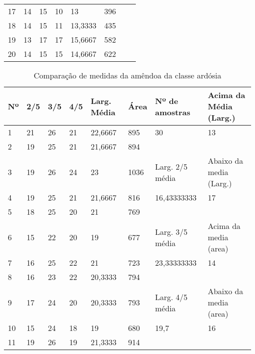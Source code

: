 \begin{anexosenv}
\begin{table}[hbtp!]
\begin{tabular}{|l|l|l|l|l|l|l|l|}
17 & 14  & 15  & 10  & 13          & 396  &                  &                        \\
18 & 14  & 15  & 11  & 13,3333     & 435  &                  &                        \\
19 & 13  & 17  & 17  & 15,6667     & 582  &                  &                        \\
20 & 14  & 15  & 15  & 14,6667     & 622  &                  &                       \\\hline
\end{tabular}
\end{table}

\begin{table}[hbtp!]
\centering
\caption{Comparação de medidas da amêndoa da classe ardósia}
\label{tab:medidas_classe_ardosia}
\begin{tabular}{|l|l|l|l|l|l|l|l|}
\hline
Nº & 2/5 & 3/5 & 4/5 & Larg. Média & Área & Nº de amostras & Acima da Média (Larg.) \\ \hline
1  & 21  & 26  & 21  & 22,6667     & 895  & 30               & 13                     \\
2  & 19  & 25  & 21  & 21,6667     & 894  &                  &                        \\\cline{7-8}
3  & 19  & 26  & 24  & 23          & 1036 & \multicolumn{1}{l|}{Larg. 2/5 média}   & \multicolumn{1}{l|}{Abaixo da media (Larg.)} \\\cline{7-8}
4  & 19  & 25  & 21  & 21,6667     & 816  & 16,43333333      & 17                     \\
5  & 18  & 25  & 20  & 21          & 769  &                  &                        \\\cline{7-8}
6  & 15  & 22  & 20  & 19          & 677  & \multicolumn{1}{l|}{Larg. 3/5 média}   & \multicolumn{1}{l|}{Acima da media (area)}  \\\cline{7-8}
7  & 16  & 25  & 22  & 21          & 723  & 23,33333333      & 14                     \\
8  & 16  & 23  & 22  & 20,3333     & 794  &                  &                        \\\cline{7-8}
9  & 17  & 24  & 20  & 20,3333     & 793  & \multicolumn{1}{l|}{Larg. 4/5 média}   & \multicolumn{1}{l|}{Abaixo da media (area)} \\\cline{7-8}
10 & 15  & 24  & 18  & 19          & 680  & 19,7             & 16                     \\
11 & 19  & 26  & 19  & 21,3333     & 914  &                  &                        \\\cline{7-8}

\end{tabular}
\end{table}
\end{anexosenv}

